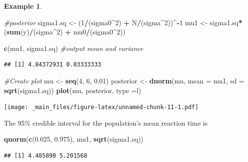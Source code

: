 \documentclass[
]{book}
\newenvironment{Shaded}{\begin{snugshade}}{\end{snugshade}}
\newcommand{\AttributeTok}[1]{\textcolor[rgb]{0.13,0.29,0.53}{#1}}
\newcommand{\CommentTok}[1]{\textcolor[rgb]{0.56,0.35,0.01}{\textit{#1}}}
\newcommand{\DecValTok}[1]{\textcolor[rgb]{0.00,0.00,0.81}{#1}}
\newcommand{\FloatTok}[1]{\textcolor[rgb]{0.00,0.00,0.81}{#1}}
\newcommand{\FunctionTok}[1]{\textcolor[rgb]{0.13,0.29,0.53}{\textbf{#1}}}
\newcommand{\NormalTok}[1]{#1}
\newcommand{\OtherTok}[1]{\textcolor[rgb]{0.56,0.35,0.01}{#1}}
\newcommand{\SpecialCharTok}[1]{\textcolor[rgb]{0.81,0.36,0.00}{\textbf{#1}}}
\newcommand{\StringTok}[1]{\textcolor[rgb]{0.31,0.60,0.02}{#1}}
\theoremstyle{definition}
\theoremstyle{definition}
\newtheorem{example}{Example}[chapter]
\theoremstyle{definition}
\theoremstyle{definition}
\theoremstyle{remark}
\begin{document}
\begin{example}
\begin{Shaded}
\begin{Highlighting}[]
\CommentTok{\#posterior}
\NormalTok{sigma1.sq }\OtherTok{\textless{}{-}}\NormalTok{ (}\DecValTok{1}\SpecialCharTok{/}\NormalTok{(sigma0}\SpecialCharTok{\^{}}\DecValTok{2}\NormalTok{)  }\SpecialCharTok{+}\NormalTok{ N}\SpecialCharTok{/}\NormalTok{(sigma}\SpecialCharTok{\^{}}\DecValTok{2}\NormalTok{))}\SpecialCharTok{\^{}{-}}\DecValTok{1}
\NormalTok{mu1       }\OtherTok{\textless{}{-}}\NormalTok{ sigma1.sq}\SpecialCharTok{*}\NormalTok{(}\FunctionTok{sum}\NormalTok{(y)}\SpecialCharTok{/}\NormalTok{(sigma}\SpecialCharTok{\^{}}\DecValTok{2}\NormalTok{) }\SpecialCharTok{+}\NormalTok{ mu0}\SpecialCharTok{/}\NormalTok{(sigma0}\SpecialCharTok{\^{}}\DecValTok{2}\NormalTok{))}

\FunctionTok{c}\NormalTok{(mu1, sigma1.sq) }\CommentTok{\#output mean and variance}
\end{Highlighting}
\end{Shaded}

\begin{verbatim}
## [1] 4.84372931 0.03333333
\end{verbatim}

\begin{Shaded}
\begin{Highlighting}[]
\CommentTok{\#Create plot}
\NormalTok{mu }\OtherTok{\textless{}{-}} \FunctionTok{seq}\NormalTok{(}\DecValTok{4}\NormalTok{, }\DecValTok{6}\NormalTok{, }\FloatTok{0.01}\NormalTok{)}
\NormalTok{posterior }\OtherTok{\textless{}{-}} \FunctionTok{dnorm}\NormalTok{(mu, }\AttributeTok{mean =}\NormalTok{ mu1, }\AttributeTok{sd =} \FunctionTok{sqrt}\NormalTok{(sigma1.sq))}
\FunctionTok{plot}\NormalTok{(mu, posterior, }\AttributeTok{type =}\StringTok{\textquotesingle{}l\textquotesingle{}}\NormalTok{)}
\end{Highlighting}
\end{Shaded}

\texttt{[image: \_main\_files/figure-latex/unnamed-chunk-11-1.pdf]}

The 95\% credible interval for the population's mean reaction time is

\begin{Shaded}
\begin{Highlighting}[]
\FunctionTok{qnorm}\NormalTok{(}\FunctionTok{c}\NormalTok{(}\FloatTok{0.025}\NormalTok{, }\FloatTok{0.975}\NormalTok{), mu1, }\FunctionTok{sqrt}\NormalTok{(sigma1.sq))}
\end{Highlighting}
\end{Shaded}

\begin{verbatim}
## [1] 4.485890 5.201568
\end{verbatim}

\end{example}
\end{document}
